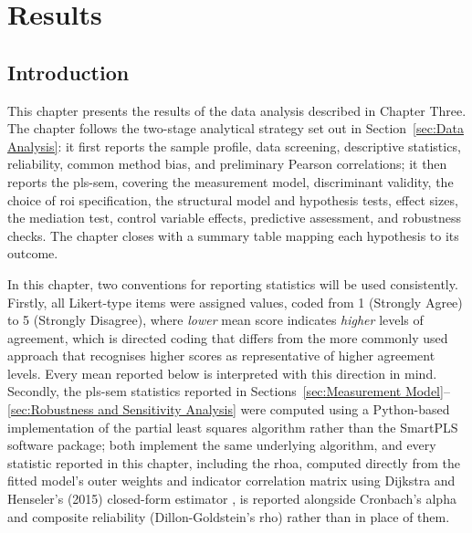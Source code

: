 \chapter{Results} %
\label{cha:ch4_results} %

\section{Introduction}
\label{sec:Ch4 Introduction}
This chapter presents the results of the data analysis described in Chapter Three. The chapter follows the two-stage analytical strategy set out in Section~\ref{sec:Data Analysis}: it first reports the sample profile, data screening, descriptive statistics, reliability, common method bias, and preliminary Pearson correlations; it then reports the \gls{pls-sem}, covering the measurement model, discriminant validity, the choice of \gls{roi} specification, the structural model and hypothesis tests, effect sizes, the mediation test, control variable effects, predictive assessment, and robustness checks. The chapter closes with a summary table mapping each hypothesis to its outcome.

In this chapter, two conventions for reporting statistics will be used consistently. Firstly, all Likert-type items were assigned values, coded from 1 (Strongly Agree) to 5 (Strongly Disagree), where  \emph{lower} mean score indicates \emph{higher} levels of agreement, which is directed coding that differs from the more commonly used approach that recognises higher scores as representative of higher agreement levels. Every mean reported below is interpreted with this direction in mind. Secondly, the \gls{pls-sem} statistics reported in Sections~\ref{sec:Measurement Model}--\ref{sec:Robustness and Sensitivity Analysis} were computed using a Python-based implementation of the partial least squares algorithm rather than the SmartPLS software package; both implement the same underlying algorithm, and every statistic reported in this chapter, including the \gls{rhoa}, computed directly from the fitted model's outer weights and indicator correlation matrix using Dijkstra and Henseler's (2015) closed-form estimator \autocite{Dijkstra2015}, is reported alongside Cronbach's alpha and composite reliability (Dillon-Goldstein's rho) rather than in place of them.

